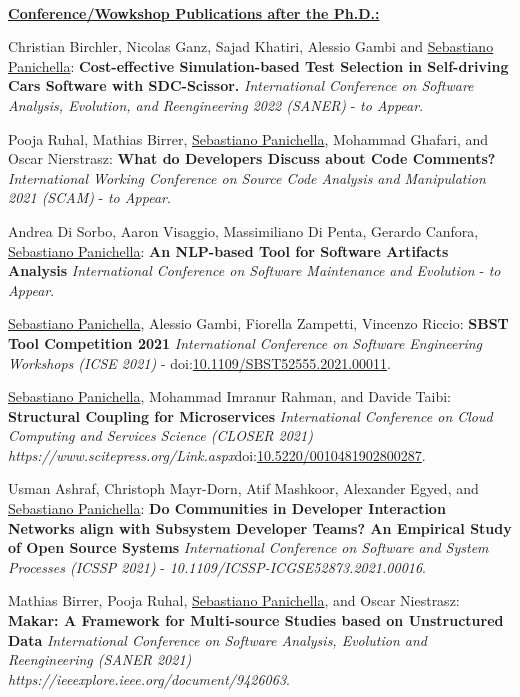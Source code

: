 \documentclass[10pt]{article}
\newcommand\doilink[1]{\href{http://dx.doi.org/#1}{#1}}
\newcommand\doi[1]{doi:\doilink{#1}}
\begin{document}
\textbf{\\\underline{Conference/Wowkshop Publications after the Ph.D.:}}\\
\begin{bibenum}
  		\item \label{Cm24} Christian Birchler, Nicolas Ganz, Sajad Khatiri, Alessio Gambi and \underline{Sebastiano Panichella}:  \textbf{Cost-effective Simulation-based Test Selection in Self-driving Cars Software with SDC-Scissor.}  \emph{International Conference on Software Analysis, Evolution, and Reengineering 2022 (SANER)} - \textit{to Appear}. 
  		\item \label{Cm23} Pooja Ruhal, Mathias Birrer, \underline{Sebastiano Panichella}, Mohammad Ghafari, and Oscar Nierstrasz:  \textbf{What do Developers Discuss about Code Comments?}  \emph{International Working Conference on Source Code Analysis and Manipulation 2021 (SCAM)} - \textit{to Appear}.
 		\item \label{Cm22} Andrea Di Sorbo, Aaron Visaggio, Massimiliano Di Penta, Gerardo Canfora, \underline{Sebastiano Panichella}:  \textbf{An NLP-based Tool for Software Artifacts Analysis}  \emph{International Conference on Software Maintenance and Evolution} - \textit{to Appear}.
 		\item \label{Cm21} \underline{Sebastiano Panichella}, Alessio Gambi, Fiorella Zampetti, Vincenzo Riccio:  \textbf{SBST Tool Competition 2021}  \emph{International Conference on Software Engineering Workshops (ICSE 2021)} - \doi{10.1109/SBST52555.2021.00011}. 
       \item \label{Cm20} \underline{Sebastiano Panichella}, Mohammad Imranur Rahman, and Davide Taibi:  \textbf{Structural Coupling for Microservices}  \emph{International Conference on Cloud Computing and Services Science (CLOSER 2021)}\\ \textit{https://www.scitepress.org/Link.aspx}\doi{10.5220/0010481902800287}. 
       \item \label{Cm19} Usman Ashraf, Christoph Mayr-Dorn, Atif Mashkoor, Alexander Egyed, and \underline{Sebastiano Panichella}:  \textbf{Do Communities in Developer Interaction Networks align with Subsystem Developer Teams? An Empirical Study of Open Source Systems}  \emph{International Conference on Software and System Processes (ICSSP 2021)} - \textit{10.1109/ICSSP-ICGSE52873.2021.00016}.   
      \item \label{Cm17} Mathias Birrer, Pooja Ruhal, \underline{Sebastiano Panichella}, and Oscar Niestrasz:  \textbf{Makar: A Framework for Multi-source Studies based on Unstructured Data}  \emph{International Conference on Software Analysis, Evolution and Reengineering (SANER 2021)}\\ \textit{https://ieeexplore.ieee.org/document/9426063}.   

\end{bibenum}
\end{document}
